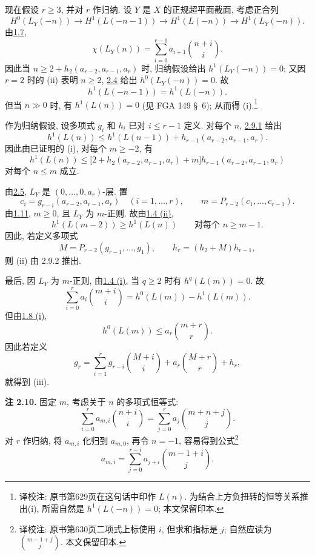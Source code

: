 现在假设 \(r\ge3\), 并对 \(r\) 作归纳. 设 \(Y\) 是 \(X\) 的正规超平面截面, 考虑正合列
\begin{equation}
H^0(L_Y(-n))\longrightarrow H^1(L(-n-1))
\longrightarrow H^1(L(-n))\longrightarrow H^1(L_Y(-n)).
\tag{2.9.1}
\end{equation}
由\hyperlink{sga6.e13.lem.1-7}{1.7},
\[
\chi(L_Y(n))=
\sum_{i=0}^{r-1}a_{i+1}\binom{n+i}{i}.
\]
因此当 \(n\ge2+h_2(a_{r-2},a_{r-1},a_r)\) 时, 归纳假设给出 \(h^1(L_Y(-n))=0\); 又因 \(r=2\) 时的 (ii) 表明 \(n\ge2\), \hyperlink{sga6.e13.lem.2-4}{2.4} 给出 \(h^0(L_Y(-n))=0\). 故
\[
h^1(L(-n-1))=h^1(L(-n)).
\]
但当 \(n\gg0\) 时, 有 \(h^1(L(n))=0\) (见 FGA 149 \S~6); 从而得 (i).\footnote{译校注: 原书第629页在这句话中印作 $L(n)$. 为结合上方负扭转的恒等关系推出(i), 所需自然是 $h^1(L(-n))=0$; 本文保留印本.}

作为归纳假设, 设多项式 \(g_i\) 和 \(h_i\) 已对 \(i\le r-1\) 定义. 对每个 \(n\), \hyperlink{sga6.e13.eq.2-9-1}{2.9.1} 给出
\[
h^1(L(n))\le h^1(L(n-1))
+h_{r-1}(a_{r-2},a_{r-1},a_r).
\]
因此由已证明的 (i), 对每个 \(m\ge-2\), 有
\begin{equation}
h^1(L(n))\le
\bigl[2+h_2(a_{r-2},a_{r-1},a_r)+m\bigr]
h_{r-1}(a_{r-2},a_{r-1},a_r)
\tag{2.9.2}
\end{equation}
对每个 \(n\le m\) 成立.

由\hyperlink{sga6.e13.lem.2-5}{2.5}, \(L_Y\) 是 \((0,\ldots,0,a_r)\)-层. 置
\[
c_i=g_{r-i}(a_{r-2},a_{r-1},a_r)
\quad(i=1,\ldots,r),
\qquad
m=P_{r-2}(c_1,\ldots,c_{r-1}).
\]
由\hyperlink{sga6.e13.thm.1-11}{1.11}, \(m\ge0\), 且 \(L_Y\) 为 \(m\)-正则. 故由\hyperlink{sga6.e13.prop.1-4}{1.4 (ii)},
\[
h^1(L(m-2))\ge h^1(L(n))
\qquad\text{对每个 }n\ge m-1.
\]
因此, 若定义多项式
\[
M=P_{r-2}(g_{r-1},\ldots,g_1),
\qquad
h_r=(h_2+M)h_{r-1},
\]
则 (ii) 由 2.9.2 推出.

最后, 因 \(L_Y\) 为 \(m\)-正则, 由\hyperlink{sga6.e13.prop.1-4}{1.4 (i)}, 当 \(q\ge2\) 时有 \(h^q(L(m))=0\). 故
\[
\sum_{i=0}^{r}a_i\binom{m+i}{i}
=h^0(L(m))-h^1(L(m)).
\]
但由\hyperlink{sga6.e13.prop.1-8}{1.8 (i)},
\[
h^0(L(m))\le a_r\binom{m+r}{r}.
\]
因此若定义
\[
g_r=
\sum_{i=1}^{r}g_{r-i}\binom{M+i}{i}
+a_r\binom{M+r}{r}+h_r,
\]
就得到 (iii).

\textbf{注 2.10.} 固定 \(m\), 考虑关于 \(n\) 的多项式恒等式:
\[
\sum_{i=0}^{r}a_{m,i}\binom{n+i}{i}
=\sum_{j=0}^{r}a_j\binom{m+n+j}{j}.
\]
对 \(r\) 作归纳, 将 \(a_{m,i}\) 化归到 \(a_{m,0}\), 再令 \(n=-1\), 容易得到公式\footnote{译校注: 原书第630页二项式上标使用 $i$, 但求和指标是 $j$; 自然应读为 $\binom{m-1+j}{j}$. 本文保留印本.}
\[
a_{m,i}=
\sum_{j=0}^{r-i}a_{j+i}\binom{m-1+i}{j}.
\]

